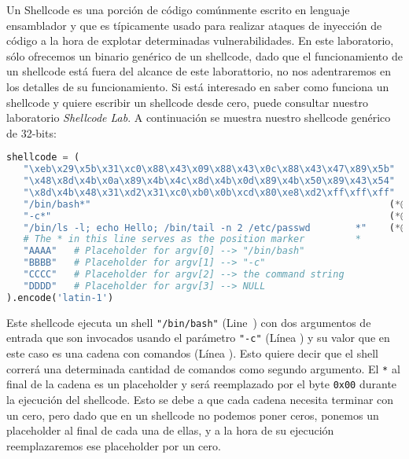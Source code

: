 
Un Shellcode es una porción de código comúnmente escrito en lenguaje ensamblador y que es típicamente usado para realizar ataques de inyección de código a la hora de explotar determinadas vulnerabilidades.
En este laboratorio, sólo ofrecemos un binario genérico de un shellcode, dado que el funcionamiento de un shellcode está fuera del alcance de este laborattorio, no nos adentraremos en los detalles de su funcionamiento.
Si está interesado en saber como funciona un shellcode y quiere escribir un shellcode desde cero, puede consultar nuestro laboratorio \textit{Shellcode Lab}.
A continuación se muestra nuestro shellcode genérico de 32-bits:

\begin{lstlisting}[language=python]
shellcode = (
   "\xeb\x29\x5b\x31\xc0\x88\x43\x09\x88\x43\x0c\x88\x43\x47\x89\x5b"
   "\x48\x8d\x4b\x0a\x89\x4b\x4c\x8d\x4b\x0d\x89\x4b\x50\x89\x43\x54"
   "\x8d\x4b\x48\x31\xd2\x31\xc0\xb0\x0b\xcd\x80\xe8\xd2\xff\xff\xff"
   "/bin/bash*"                                                     (*@\ding{202}@*)
   "-c*"                                                            (*@\ding{203}@*)
   "/bin/ls -l; echo Hello; /bin/tail -n 2 /etc/passwd        *"    (*@\ding{204}@*)
   # The * in this line serves as the position marker         *
   "AAAA"   # Placeholder for argv[0] --> "/bin/bash"
   "BBBB"   # Placeholder for argv[1] --> "-c"
   "CCCC"   # Placeholder for argv[2] --> the command string
   "DDDD"   # Placeholder for argv[3] --> NULL
).encode('latin-1')
\end{lstlisting}

Este shellcode ejecuta un shell \texttt{"/bin/bash"} (Line~) con dos argumentos de entrada que son invocados usando el parámetro \texttt{"-c"} (Línea ) y su valor que en este caso es una cadena con comandos (Línea ). Esto quiere decir que el shell correrá una determinada cantidad de comandos como segundo argumento.
El \texttt{*} al final de la cadena es un placeholder y será reemplazado por el byte \texttt{0x00} durante la ejecución del shellcode.
Esto se debe a que cada cadena necesita terminar con un cero, pero dado que en un shellcode no podemos poner ceros, ponemos un placeholder al final de cada una de ellas, y a la hora de su ejecución reemplazaremos ese placeholder por un cero.

